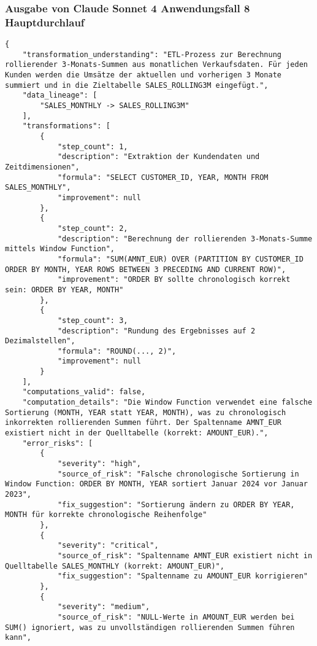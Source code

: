 \subsubsection{Ausgabe von Claude Sonnet 4 Anwendungsfall 8 Hauptdurchlauf}\label{anhang:subsubsec:claude_case8_prompt1}
\begin{lstlisting}[caption={Ausgabe: Claude Sonnet 4 Anwendungsfall 8 Hauptdurchlauf},label={claude_case8_prompt1}]
{
    "transformation_understanding": "ETL-Prozess zur Berechnung rollierender 3-Monats-Summen aus monatlichen Verkaufsdaten. Für jeden Kunden werden die Umsätze der aktuellen und vorherigen 3 Monate summiert und in die Zieltabelle SALES_ROLLING3M eingefügt.",
    "data_lineage": [
        "SALES_MONTHLY -> SALES_ROLLING3M"
    ],
    "transformations": [
        {
            "step_count": 1,
            "description": "Extraktion der Kundendaten und Zeitdimensionen",
            "formula": "SELECT CUSTOMER_ID, YEAR, MONTH FROM SALES_MONTHLY",
            "improvement": null
        },
        {
            "step_count": 2,
            "description": "Berechnung der rollierenden 3-Monats-Summe mittels Window Function",
            "formula": "SUM(AMNT_EUR) OVER (PARTITION BY CUSTOMER_ID ORDER BY MONTH, YEAR ROWS BETWEEN 3 PRECEDING AND CURRENT ROW)",
            "improvement": "ORDER BY sollte chronologisch korrekt sein: ORDER BY YEAR, MONTH"
        },
        {
            "step_count": 3,
            "description": "Rundung des Ergebnisses auf 2 Dezimalstellen",
            "formula": "ROUND(..., 2)",
            "improvement": null
        }
    ],
    "computations_valid": false,
    "computation_details": "Die Window Function verwendet eine falsche Sortierung (MONTH, YEAR statt YEAR, MONTH), was zu chronologisch inkorrekten rollierenden Summen führt. Der Spaltenname AMNT_EUR existiert nicht in der Quelltabelle (korrekt: AMOUNT_EUR).",
    "error_risks": [
        {
            "severity": "high",
            "source_of_risk": "Falsche chronologische Sortierung in Window Function: ORDER BY MONTH, YEAR sortiert Januar 2024 vor Januar 2023",
            "fix_suggestion": "Sortierung ändern zu ORDER BY YEAR, MONTH für korrekte chronologische Reihenfolge"
        },
        {
            "severity": "critical",
            "source_of_risk": "Spaltenname AMNT_EUR existiert nicht in Quelltabelle SALES_MONTHLY (korrekt: AMOUNT_EUR)",
            "fix_suggestion": "Spaltenname zu AMOUNT_EUR korrigieren"
        },
        {
            "severity": "medium",
            "source_of_risk": "NULL-Werte in AMOUNT_EUR werden bei SUM() ignoriert, was zu unvollständigen rollierenden Summen führen kann",

\end{lstlisting}
